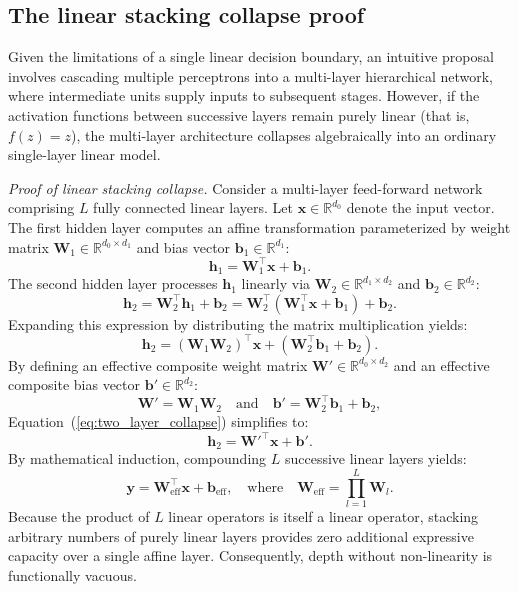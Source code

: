 \documentclass[../../../main.tex]{subfiles}
\begin{document}
\subsection{The linear stacking collapse proof}
\label{subsec:linear_stacking_collapse}

Given the limitations of a single linear decision boundary, an intuitive proposal involves cascading multiple perceptrons into a multi-layer hierarchical network, where intermediate units supply inputs to subsequent stages. However, if the activation functions between successive layers remain purely linear (that is, $f(z) = z$), the multi-layer architecture collapses algebraically into an ordinary single-layer linear model.

\textit{Proof of linear stacking collapse.} Consider a multi-layer feed-forward network comprising $L$ fully connected linear layers. Let $\mathbf{x} \in \mathbb{R}^{d_0}$ denote the input vector. The first hidden layer computes an affine transformation parameterized by weight matrix $\mathbf{W}_1 \in \mathbb{R}^{d_0 \times d_1}$ and bias vector $\mathbf{b}_1 \in \mathbb{R}^{d_1}$:
\begin{equation}
\mathbf{h}_1 = \mathbf{W}_1^\top \mathbf{x} + \mathbf{b}_1.
\end{equation}
The second hidden layer processes $\mathbf{h}_1$ linearly via $\mathbf{W}_2 \in \mathbb{R}^{d_1 \times d_2}$ and $\mathbf{b}_2 \in \mathbb{R}^{d_2}$:
\begin{equation}
\mathbf{h}_2 = \mathbf{W}_2^\top \mathbf{h}_1 + \mathbf{b}_2 = \mathbf{W}_2^\top \left( \mathbf{W}_1^\top \mathbf{x} + \mathbf{b}_1 \right) + \mathbf{b}_2.
\end{equation}
Expanding this expression by distributing the matrix multiplication yields:
\begin{equation}
\mathbf{h}_2 = \left( \mathbf{W}_1 \mathbf{W}_2 \right)^\top \mathbf{x} + \left( \mathbf{W}_2^\top \mathbf{b}_1 + \mathbf{b}_2 \right).
\label{eq:two_layer_collapse}
\end{equation}
By defining an effective composite weight matrix $\mathbf{W}' \in \mathbb{R}^{d_0 \times d_2}$ and an effective composite bias vector $\mathbf{b}' \in \mathbb{R}^{d_2}$:
\begin{equation}
\mathbf{W}' = \mathbf{W}_1 \mathbf{W}_2 \quad \text{and} \quad \mathbf{b}' = \mathbf{W}_2^\top \mathbf{b}_1 + \mathbf{b}_2,
\end{equation}
Equation~(\ref{eq:two_layer_collapse}) simplifies to:
\begin{equation}
\mathbf{h}_2 = \mathbf{W}'^\top \mathbf{x} + \mathbf{b}'.
\end{equation}
By mathematical induction, compounding $L$ successive linear layers yields:
\begin{equation}
\mathbf{y} = \mathbf{W}_{\text{eff}}^\top \mathbf{x} + \mathbf{b}_{\text{eff}}, \quad \text{where} \quad \mathbf{W}_{\text{eff}} = \prod_{l=1}^L \mathbf{W}_l.
\end{equation}
Because the product of $L$ linear operators is itself a linear operator, stacking arbitrary numbers of purely linear layers provides zero additional expressive capacity over a single affine layer. Consequently, depth without non-linearity is functionally vacuous.
\end{document}
